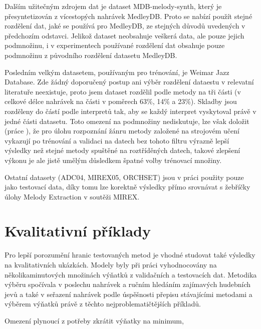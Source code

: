 Dalším užitečným zdrojem dat je dataset MDB-melody-synth, který je přesyntetizován z vícestopých nahrávek MedleyDB. Proto se nabízí použít stejné rozdělení dat, jaké se používá pro MedleyDB, ze stejných důvodů uvedených v předchozím odstavci. Jelikož dataset neobsahuje veškerá data, ale pouze jejich podmnožinu, i v experimentech používané rozdělení dat obsahuje pouze podmnožinu z původního rozdělení datasetu MedleyDB. 

Posledním velkým datasetem, používaným pro trénování, je Weimar Jazz Database. Zde žádný doporučený postup ani výběr rozdělení dataestu v relevatní literatuře neexistuje, proto jsem dataset rozdělil podle metody \cite{Bittner2017} na tři části (v celkové délce nahrávek na části v poměrech 63\%, 14\% a 23\%). Skladby jsou rozděleny do částí podle interpretů tak, aby se každý interpret vyskytoval právě v jedné části datasetu. Toto omezení na podmnožiny \cite{Bittner2017} nediskutuje, lze však doložit (práce \cite{Sturm2013}), že pro úlohu rozpoznání žánru metody založené na strojovém učení vykazují po trénování a validaci na datech bez tohoto filtru výrazně lepší výsledky než stejné metody spuštěné na roztříděných datech, takové zlepšení výkonu je ale jistě umělým důsledkem špatné volby trénovací množiny. 

Ostatní datasety (ADC04, MIREX05, ORCHSET) jsou v práci použity pouze jako testovací data, díky tomu lze korektně výsledky přímo srovnávat s žebříčky úlohy Melody Extraction v soutěži MIREX.



\section{Kvalitativní příklady}

Pro lepší porozumění hranic testovaných metod je vhodné studovat také výsledky na kvalitativních ukázkách. Modely byly při práci vyhodnocovány na několikaminutových množinách výňatků z validačních a testovacích dat. Metodika výběru spočívala v poslechu nahrávek a ručním hledáním zajímavých hudebních jevů a také v seřazení nahrávek podle úspěšnosti přepisu stávajícími metodami a výběrem výňatků právě z těchto nejproblematičtějších příkladů.

Omezení plynoucí z potřeby zkrátit výňatky na minimum,


